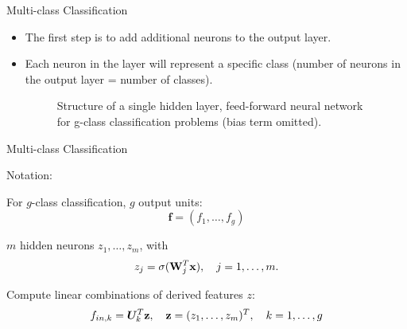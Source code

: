 \begin{frame} {Multi-class Classification}
\begin{itemize}
\item The first step is to add additional neurons to the output layer.
\item Each neuron in the layer will represent a specific class (number of neurons in the output layer = number of classes).
\begin{figure}
\centering
{}
\caption{\footnotesize Structure of a single hidden layer, feed-forward neural network for g-class classification problems (bias term omitted).}
\end{figure}
\end{itemize}
\end{frame}

\begin{frame} {Multi-class Classification}
\vspace{5mm}
\begin{blocki}{Notation:}
\item For $g$-class classification, $g$ output units: $$\mathbf{f} = (f_1, \dots, f_g)$$
\item $m$ hidden neurons $z_1, \dots, z_m$, with
    $$ z_j = \sigma(\mathbf{W}_j^T \mathbf{x}), \quad j = 1,\ldots,m. $$
\item Compute linear combinations of derived features $z$:
    $$ f_{in,k} = \bm{U}_k^T \mathbf{z}, \quad \mathbf{z}=(z_1,\dots, z_m)^T, \quad k = 1,\ldots,g$$
\end{blocki}
\end{frame}

